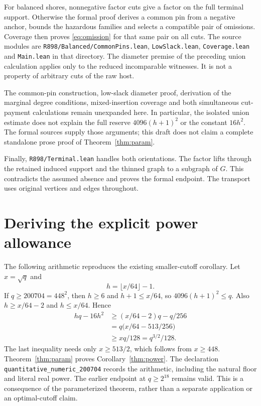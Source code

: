 \documentclass[11pt]{article}
\begin{document}
For balanced shores, nonnegative factor cuts give a factor on the full terminal support. Otherwise the formal proof derives a common pin from a negative anchor, bounds the hazardous families and selects a compatible pair of omissions. Coverage then proves \eqref{eq:omission} for that same pair on all cuts. The source modules are \nolinkurl{R898/Balanced/CommonPins.lean}, \nolinkurl{LowSlack.lean}, \nolinkurl{Coverage.lean} and \nolinkurl{Main.lean} in that directory. The diameter premise of the preceding union calculation applies only to the reduced incomparable witnesses. It is not a property of arbitrary cuts of the raw host.

The common-pin construction, low-slack diameter proof, derivation of the marginal degree conditions, mixed-insertion coverage and both simultaneous cut-payment calculations remain unexpanded here. In particular, the isolated union estimate does not explain the full reserve $4096(h+1)^2$ or the constant $16h^2$. The formal sources supply those arguments; this draft does not claim a complete standalone prose proof of Theorem~\ref{thm:param}.

Finally, \nolinkurl{R898/Terminal.lean} handles both orientations. The factor lifts through the retained induced support and the thinned graph to a subgraph of $G$. This contradicts the assumed absence and proves the formal endpoint. The transport uses original vertices and edges throughout.

\section{Deriving the explicit power allowance}
The following arithmetic reproduces the existing smaller-cutoff corollary. Let $x=\sqrt q$ and
\[
 h=\lfloor x/64\rfloor-1.
\]
If $q\ge200704=448^2$, then $h\ge6$ and $h+1\le x/64$, so $4096(h+1)^2\le q$. Also $h\ge x/64-2$ and $h\le x/64$. Hence
\begin{align*}
 hq-16h^2
 &\ge(x/64-2)q-q/256\\
 &=q\bigl(x/64-513/256\bigr)\\
 &\ge xq/128=q^{3/2}/128.
\end{align*}
The last inequality needs only $x\ge513/2$, which follows from $x\ge448$. Theorem~\ref{thm:param} proves Corollary~\ref{thm:power}. The declaration \nolinkurl{quantitative_numeric_200704} records the arithmetic, including the natural floor and literal real power. The earlier endpoint at $q\ge2^{18}$ remains valid. This is a consequence of the parameterized theorem, rather than a separate application or an optimal-cutoff claim.
\end{document}
